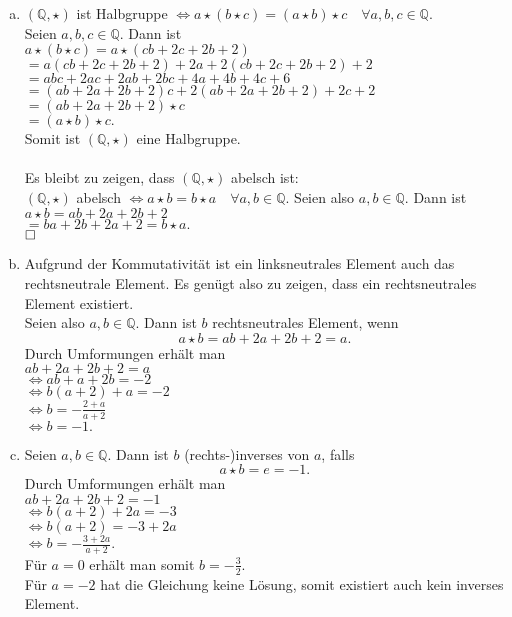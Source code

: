 \documentclass[12pt,a4paper]{article}
\newcommand{\qed}{\null\nobreak\hfill\square}
\begin{document}
\begin{enumerate}[(a)]
    \item $(\mathbb{Q}, \star)$ ist Halbgruppe $\Leftrightarrow a \star (b \star c) = (a \star b) \star c \quad \forall a,b,c \in \mathbb{Q}.$\\
    Seien $a,b,c \in \mathbb{Q}$. Dann ist\\
    $a \star (b \star c) = a \star (cb + 2c + 2b + 2)$\\
    $= a(cb + 2c + 2b + 2) + 2a + 2(cb + 2c + 2b + 2) + 2$\\
    $= abc + 2ac + 2ab + 2bc + 4a + 4b + 4c + 6$\\
    $= (ab + 2a + 2b + 2)c + 2(ab + 2a + 2b + 2) + 2c + 2$\\
    $=(ab + 2a + 2b + 2) \star c$\\
    $= (a \star b) \star c.$\\
    Somit ist $(\mathbb{Q}, \star)$ eine Halbgruppe.\\\\
    Es bleibt zu zeigen, dass $(\mathbb{Q}, \star)$ abelsch ist:\\
    $(\mathbb{Q}, \star)$ abelsch $\Leftrightarrow a \star b = b \star a \quad \forall a,b \in \mathbb{Q}.$
    Seien also $a, b \in \mathbb{Q}$. Dann ist\\
    $a \star b = ab + 2a + 2b + 2$\\
    $= ba + 2b + 2a + 2 = b \star a.$\\
    $\qed$

    \item Aufgrund der Kommutativität ist ein linksneutrales Element auch das rechtsneutrale Element.
    Es genügt also zu zeigen, dass ein rechtsneutrales Element existiert.\\
    Seien also $a, b \in \mathbb{Q}$. Dann ist $b$ rechtsneutrales Element, wenn
    \[
    a \star b = ab + 2a + 2b + 2 = a.
    \]
    Durch Umformungen erhält man\\
    $ab + 2a + 2b + 2 = a$\\
    $\Leftrightarrow ab + a + 2b = -2$\\
    $\Leftrightarrow b (a + 2) + a = -2$\\
    $\Leftrightarrow b = - \frac{2 + a}{a + 2}$\\
    $\Leftrightarrow b = -1.$

    \item Seien $a, b \in \mathbb{Q}$. Dann ist $b$ (rechts-)inverses von $a$, falls
    \[
    a \star b = e = -1.
    \]
    Durch Umformungen erhält man\\
    $ab +2a +2b +2 = -1$\\
    $\Leftrightarrow b(a+2) +2a = -3$\\
    $\Leftrightarrow b(a+2) = -3 +2a$\\
    $\Leftrightarrow b = - \frac{3 + 2a}{a + 2}.$\\
    Für $a = 0$ erhält man somit $b = - \frac{3}{2}$.\\
    Für $a = -2$ hat die Gleichung keine Lösung, somit existiert auch kein inverses Element.
\end{enumerate}
\end{document}
